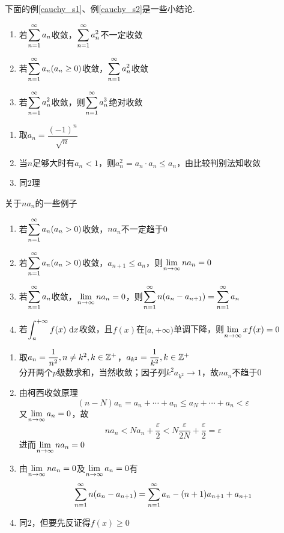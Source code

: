 \par 下面的例\ref{cauchy_s1}、例\ref{cauchy_s2}是一些小结论.
\begin{example}
\label{cauchy_s1}
\begin{enumerate}
	\item 若$\displaystyle\sum_{n=1}^{\infty}a_n$收敛，$\displaystyle\sum_{n=1}^{\infty}a_n^2$不一定收敛
	\item 若$\displaystyle\sum_{n=1}^{\infty}a_n(a_n\geq 0)$收敛，$\displaystyle\sum_{n=1}^{\infty}a_n^2$收敛
	\item 若$\displaystyle\sum_{n=1}^{\infty}a_n^2$收敛，则$\displaystyle\sum_{n=1}^{\infty}a_n^3$绝对收敛
\end{enumerate}
\begin{analysis}
\begin{enumerate}
	\item 取$a_n=\dfrac{(-1)^n}{\sqrt{n}}$
	\item 当$n$足够大时有$a_n<1$，则$a_n^2=a_n\cdot a_n\leq a_n$，由比较判别法知收敛
	\item 同2理
\end{enumerate}
\end{analysis}
\begin{example}
\label{cauchy_s2}
关于$na_n$的一些例子
\begin{enumerate}
	\item 若$\displaystyle\sum_{n=1}^{\infty}a_n(a_n>0)$收敛，$na_n$不一定趋于0
	\item 若$\displaystyle\sum_{n=1}^{\infty}a_n(a_n>0)$收敛，$a_{n+1}\leq a_n$，则$\displaystyle\lim_{n\to\infty}na_n=0$
	\item 若$\displaystyle\sum_{n=1}^{\infty}a_n$收敛，$\displaystyle\lim_{n\to\infty}na_n=0$，则$\displaystyle\sum_{n=1}^{\infty}n(a_n-a_{n+1})=\displaystyle\sum_{n=1}^{\infty}a_n$
	\item 若$\displaystyle\int_{a}^{+\infty}{f(x)}\,\,\mathrm{d} x$收敛，且$f(x)$在$[a,+\infty)$单调下降，则$\displaystyle\lim_{n\to\infty}xf(x)=0$
\end{enumerate}
\end{example}
\begin{analysis}
\begin{enumerate}
	\item 取$a_n=\dfrac{1}{n^2},n\neq k^2,k\in\mathbb{Z}^+$，$a_{k^2}=\dfrac{1}{k^2},k\in\mathbb{Z}^+$\\
分开两个$p$级数求和，当然收敛；因子列$k^2a_{k^2}\to 1$，故$na_n$不趋于$0$
	\item 由柯西收敛原理
\[(n-N)a_n=a_n+\cdots+a_n\leq a_N+\cdots+a_n<\varepsilon\]
又$\displaystyle\lim_{n\to\infty}a_n=0$，故
\[na_n<Na_n+\dfrac{\varepsilon}{2}<N\dfrac{\varepsilon}{2N}+\dfrac{\varepsilon}{2}=\varepsilon\]
进而$\displaystyle\lim_{n\to\infty}na_n=0$
	\item 由$\displaystyle\lim_{n\to\infty}na_n=0$及$\displaystyle\lim_{n\to\infty}a_n=0$有
\[\displaystyle\sum_{n=1}^{\infty}n(a_n-a_{n+1})=\displaystyle\sum_{n=1}^{\infty}a_n-(n+1)a_{n+1}+a_{n+1}\]
	\item 同2，但要先反证得$f(x)\geq 0$
\end{enumerate}
\end{analysis}
\end{example}
